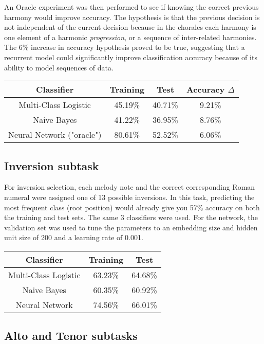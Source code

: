 \documentclass[12pt]{article}
\begin{document}
An Oracle experiment was then performed to see if knowing the correct previous harmony would improve accuracy. The hypothesis is that the previous decision is not independent of the current decision because in the chorales each harmony is one element of a harmonic \textit{progression}, or a sequence of inter-related harmonies. The 6\% increase in accuracy hypothesis proved to be true, suggesting that a recurrent model could significantly improve classification accuracy because of its ability to model sequences of data.

\begin{center}
	\begin{tabular}{ c | c | c | c }
		\textbf{Classifier} & \textbf{Training} & \textbf{Test} & \textbf{Accuracy $\Delta$}\\ \hline
		Multi-Class Logistic & 45.19\% & 40.71\% & 9.21\% \\ \hline
		Naive Bayes & 41.22\% & 36.95\% & 8.76\% \\ \hline
		Neural Network ("oracle") & 80.61\% & 52.52\% & 6.06\%
	\end{tabular}
\end{center}


\subsection{Inversion subtask}

For inversion selection, each melody note and the correct corresponding Roman numeral were assigned one of 13 possible inversions. In this task, predicting the most frequent class (root position) would already give you 57\% accuracy on both the training and test sets. The same 3 classifiers were used. For the network, the validation set was used to tune the parameters to an embedding size and hidden unit size of 200 and a learning rate of 0.001.

\begin{center}
	\begin{tabular}{ c | c | c }
		\textbf{Classifier} & \textbf{Training} & \textbf{Test} \\ \hline
		Multi-Class Logistic & 63.23\% & 64.68\% \\ \hline
		Naive Bayes & 60.35\% & 60.92\% \\ \hline
		Neural Network & 74.56\% & 66.01\%
	\end{tabular}
\end{center}

\subsection{Alto and Tenor subtasks}
\end{document}
